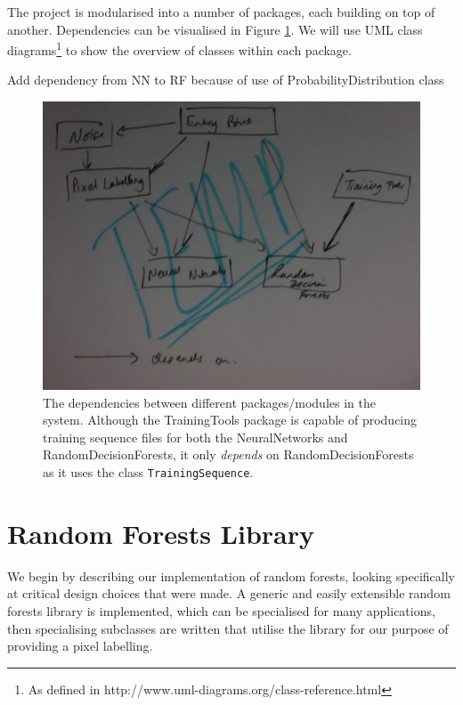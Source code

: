 \documentclass[12pt,twoside,notitlepage]{report}
\begin{document}
    The project is modularised into a number of packages, each building on top of another. Dependencies can be 
    visualised in Figure \ref{fig:package_dependencies}. We will use UML class 
    diagrams\footnote{As defined in http://www.uml-diagrams.org/class-reference.html} 
    to show the overview of classes within each package.

    \begin{framed}
        Add dependency from NN to RF because of use of ProbabilityDistribution class
    \end{framed}

    \begin{figure}[H]
        \centering
        \includegraphics[scale=0.5]{package_dependencies}
        \caption{The dependencies between different packages/modules in the system. Although the TrainingTools package is
        capable of producing training sequence files for both the NeuralNetworks and RandomDecisionForests, it only 
        \textit{depends} on RandomDecisionForests as it uses the class \texttt{TrainingSequence}.}
        \label{fig:package_dependencies}
    \end{figure}




    \section{Random Forests Library}
        We begin by describing our implementation of random forests, looking specifically at critical design 
        choices that were made. A generic and easily extensible random forests library is implemented, which can 
        be specialised for many applications, then specialising subclasses are written that utilise the library for our 
        purpose of providing a pixel labelling.
\end{document}
